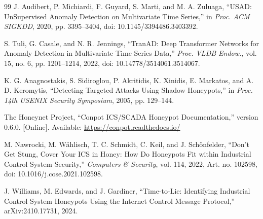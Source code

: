 \documentclass[journal]{IEEEtran}
\begin{document}
\begin{thebibliography}{99}
J. Audibert, P. Michiardi, F. Guyard, S. Marti, and M. A. Zuluaga, ``USAD: UnSupervised Anomaly Detection on Multivariate Time Series,'' in \emph{Proc. ACM SIGKDD}, 2020, pp. 3395--3404, doi: 10.1145/3394486.3403392.

S. Tuli, G. Casale, and N. R. Jennings, ``TranAD: Deep Transformer Networks for Anomaly Detection in Multivariate Time Series Data,'' \emph{Proc. VLDB Endow.}, vol. 15, no. 6, pp. 1201--1214, 2022, doi: 10.14778/3514061.3514067.

K. G. Anagnostakis, S. Sidiroglou, P. Akritidis, K. Xinidis, E. Markatos, and A. D. Keromytis, ``Detecting Targeted Attacks Using Shadow Honeypots,'' in \emph{Proc. 14th USENIX Security Symposium}, 2005, pp. 129--144.

The Honeynet Project, ``Conpot ICS/SCADA Honeypot Documentation,'' version 0.6.0. [Online]. Available: \url{https://conpot.readthedocs.io/}

M. Nawrocki, M. W\"ahlisch, T. C. Schmidt, C. Keil, and J. Sch\"onfelder, ``Don't Get Stung, Cover Your ICS in Honey: How Do Honeypots Fit within Industrial Control System Security,'' \emph{Computers \& Security}, vol. 114, 2022, Art. no. 102598, doi: 10.1016/j.cose.2021.102598.

J. Williams, M. Edwards, and J. Gardiner, ``Time-to-Lie: Identifying Industrial Control System Honeypots Using the Internet Control Message Protocol,'' arXiv:2410.17731, 2024.

\end{thebibliography}
\endgroup
\end{document}
